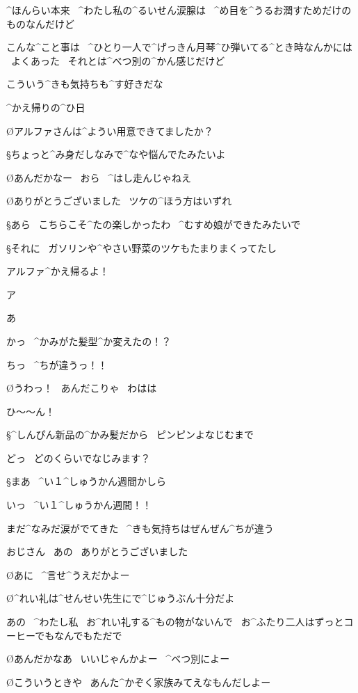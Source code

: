 \A ^{ほんらい}{本来}
\ ^{わたし}{私}の^{るいせん}{涙腺}は
\ ^{め}{目}を^{うるお}{潤}すためだけのものなんだけど

\A こんな^{こと}{事}は
\ ^{ひとり}{一人}で^{げっきん}{月琴}^{ひ}{弾}いてる^{とき}{時}なんかには
\ よくあった
\ それとは^{べつ}{別}の^{かん}{感}じだけど

\A こういう^{きも}{気持}ちも^{す}{好}きだな

\page
\N ^{かえ}{帰}りの^{ひ}{日}

\O アルファさんは^{ようい}{用意}できてましたか？

\S ちょっと^{み}{身}だしなみで^{なや}{悩}んでたみたいよ

\O あんだかなー
\ おら
\ ^{はし}{走}んじゃねえ

\O ありがとうございました
\ ツケの^{ほう}{方}はいずれ

\S あら
\ こちらこそ^{たの}{楽}しかったわ
\ ^{むすめ}{娘}ができたみたいで

\S それに
\ ガソリンや^{やさい}{野菜}のツケもたまりまくってたし

\T アルファ^{かえ}{帰}るよ！

\page
\T ア

\A あ

\T かっ
\ ^{かみがた}{髪型}^{か}{変}えたの！？

\A ちっ
\ ^{ちが}{違}うっ！！

\O うわっ！
\ あんだこりゃ
\ わはは

\A ひ〜〜ん！

\S ^{しんぴん}{新品}の^{かみ}{髪}だから
\ ピンピンよなじむまで

\A どっ
\ どのくらいでなじみます？

\page
\S まあ
\ ^{い}{１}^{しゅうかん}{週間}かしら

\A いっ
\ ^{い}{１}^{しゅうかん}{週間}！！

\A まだ^{なみだ}{涙}がでてきた
\ ^{きも}{気持}ちはぜんぜん^{ちが}{違}う

\page
\A おじさん
\ あの
\ ありがとうございました

\O あに
\ ^{言}{せ}^{う}{え}だかよー

\O ^{れい}{礼}は^{せんせい}{先生}にで^{じゅうぶん}{十分}だよ

\A あの
\ ^{わたし}{私}
\ お^{れい}{礼}する^{もの}{物}がないんで
\ お^{ふたり}{二人}はずっとコーヒーでもなんでもただで

\O あんだかなあ
\ いいじゃんかよー
\ ^{べつ}{別}によー

\O こういうときや
\ あんた^{かぞく}{家族}みてえなもんだしよー

